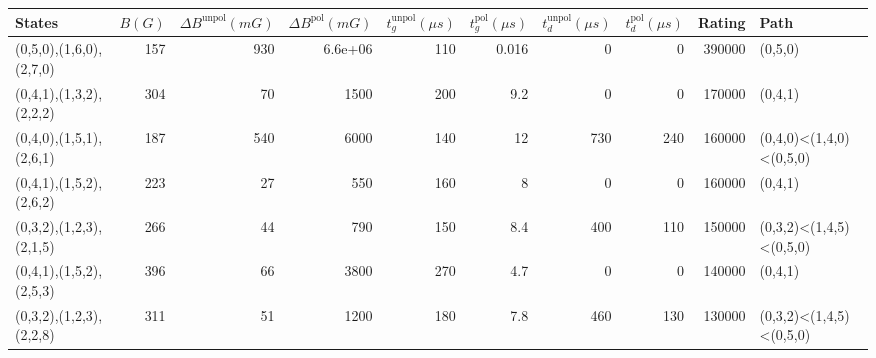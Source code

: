 \begin{tabular}{lrrrrrrrrl}
\hline
 {States}                &   {$B(G)$} &   {$\Delta B^{\text{unpol}}(mG)$} &   {$\Delta B^{\text{pol}}(mG)$} &   {$t^{\text{unpol}}_{g}(\mu s)$} &   {$t^{\text{pol}}_{g}(\mu s)$} &   {$t^{\text{unpol}}_{d}(\mu s)$} &   {$t^{\text{pol}}_{d}(\mu s)$} &   {Rating} & {Path}                  \\
\hline
 (0,5,0),(1,6,0),(2,7,0) &        157 &                               930 &                         6.6e+06 &                               110 &                           0.016 &                                 0 &                               0 &     390000 & (0,5,0)                 \\
 (0,4,1),(1,3,2),(2,2,2) &        304 &                                70 &                      1500       &                               200 &                           9.2   &                                 0 &                               0 &     170000 & (0,4,1)                 \\
 (0,4,0),(1,5,1),(2,6,1) &        187 &                               540 &                      6000       &                               140 &                          12     &                               730 &                             240 &     160000 & (0,4,0)<(1,4,0)<(0,5,0) \\
 (0,4,1),(1,5,2),(2,6,2) &        223 &                                27 &                       550       &                               160 &                           8     &                                 0 &                               0 &     160000 & (0,4,1)                 \\
 (0,3,2),(1,2,3),(2,1,5) &        266 &                                44 &                       790       &                               150 &                           8.4   &                               400 &                             110 &     150000 & (0,3,2)<(1,4,5)<(0,5,0) \\
 (0,4,1),(1,5,2),(2,5,3) &        396 &                                66 &                      3800       &                               270 &                           4.7   &                                 0 &                               0 &     140000 & (0,4,1)                 \\
 (0,3,2),(1,2,3),(2,2,8) &        311 &                                51 &                      1200       &                               180 &                           7.8   &                               460 &                             130 &     130000 & (0,3,2)<(1,4,5)<(0,5,0) \\

\end{tabular}
